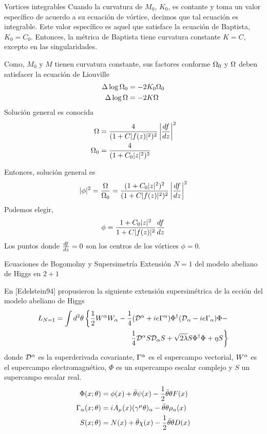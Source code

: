 \documentclass[11pt,t]{beamer}
\newcommand{\subt}[1]{{\footnotesize \color{subtitle} {#1}}}
\begin{document}
\begin{frame}{Vortices integrables}
Cuando la curvatura de $M_0$, $K_0$, es contante y toma un valor específico de acuerdo a su ecuación de vórtice, decimos que tal ecuación es integrable. Este valor específico es aquel que satisface la ecuación de Baptista, $K_0=C_0$. Entonces, la métrica de Baptista tiene curvatura constante $K=C$, excepto en las singularidades.

Como, $M_0$ y $M$ tienen curvatura constante, sus factores conforme $\Omega_0$ y $\Omega$ deben satisfacer la ecuación de Liouville
\begin{align}
\Delta\log\Omega_0 &= -2K_0\Omega_0\\
\Delta\log\Omega &= -2K\Omega
\end{align}
Solución general es conocida
\begin{align}
\Omega &= \frac{4}{(1+C|f(z)|^2)^2}\left|\frac{df}{dz}\right|^2\\
\Omega_0 &= \frac{4}{(1+C_0|z|^2)^2}
\end{align}

\end{frame}

\begin{frame}
Entonces, solución general es
\begin{align}
|\phi|^2 = \frac{\Omega}{\Omega_0} = \frac{(1+C_0|z|^2)^2}{(1+C|f(z)|^2)^2}\left|\frac{df}{dz}\right|^2
\end{align}
Podemos elegir,
\begin{align}
\phi = \frac{1+C_0|z|^2}{1+C|f(z)|^2}\frac{df}{dz}
\end{align}
Los puntos donde $\frac{df}{dz}=0$ son los centros de los vórtices $\phi=0$.
\end{frame}

\begin{frame}{Ecuaciones de Bogomolny y Supersimetría}
\subt{Extensión $N=1$ del modelo abeliano de Higgs en $2+1$}

En [Edelstein94] propusieron la siguiente extensión supersimétrica de la ección del modelo abeliano de Higgs
\begin{align*}
L_{N=1} = \int d^2\theta\left\{\frac{1}{2} W^\alpha W_\alpha-\frac{1}{4}(\mathcal{D}^\alpha+ie\Gamma^\alpha)\Phi^\dagger(\mathcal{D}_\alpha-ie\Gamma_\alpha)\Phi-\right.\\ 
\left.\frac{1}{4}\mathcal{D}^\alpha S\mathcal{D}_\alpha S+\sqrt{2\lambda}S\Phi^\dagger\Phi+\eta S\right\}
\end{align*}
donde $\mathcal{D}^\alpha$ es la superderivada covariante, $\Gamma^\alpha$ es el supercampo vectorial, $W^\alpha$ es el supercampo electromagnético, $\Phi$ es un supercampo escalar complejo y $S$ un supercampo escalar real.
\begin{align}
\Phi(x;\theta) &= \phi(x)+\bar\theta\psi(x)-\frac{1}{2}\bar\theta\theta F(x)\\
\Gamma_\alpha(x;\theta) &= iA_\mu(x)(\gamma^\mu\theta)_\alpha-\bar\theta\theta\rho_\alpha(x)\\
S(x;\theta) &= N(x)+\bar\theta\chi(x)-\frac{1}{2}\bar\theta\theta D(x)
\end{align}
\end{frame}
\end{document}
